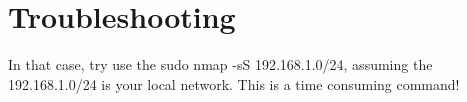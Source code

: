 \section{Troubleshooting}

\begin{description}[style=nextline]
	\item [The command \colorbox{gray!10}{arp -a} do not show my \gls{Rpi}] In that case, try use the \colorbox{gray!10}{sudo nmap -sS 192.168.1.0/24}, assuming the 192.168.1.0/24 is your local network. This is a time consuming command!	
\end{description}



